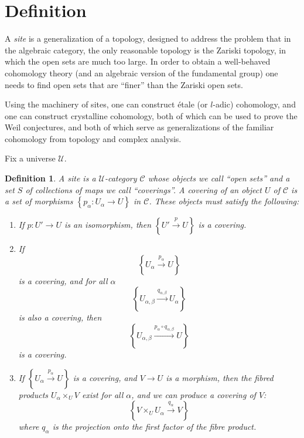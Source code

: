 \documentclass[12pt]{article}
\newcommand{\curlies}[1]{\left\{{#1}\right\}}
\newtheorem{defn}{Definition}
\begin{document}
\section*{Definition}

A \emph{site} is a generalization of a topology, designed to address the problem that in the algebraic category, the only reasonable topology is the Zariski topology, in which the open sets are much too large.  In order to obtain a well-behaved cohomology theory (and an algebraic version of the fundamental group) one needs to find open sets that are ``finer'' than the Zariski open sets.  

Using the machinery of sites, one can construct \'etale (or $l$-adic) cohomology, and one can construct crystalline cohomology, both of which can be used to prove the Weil conjectures, and both of which serve as generalizations of the familiar cohomology from topology and complex analysis. 

Fix a universe $\mathcal{U}$.

\begin{defn}
A \emph{site} is a $\mathcal{U}$-category $\mathcal{C}$ whose objects we call
``open sets'' and a set $S$ of collections of maps we call
``coverings''.  A covering of an object $U$ of $\mathcal{C}$ is a  set of morphisms
$\curlies{p_\alpha : U_\alpha \to U}$ in $\mathcal{C}$.  These objects
must satisfy the following:
\begin{enumerate}
\item If $p:U'\to U$ is an isomorphism, then $\curlies{U' \overset{p}{\to} U}$ is a covering.
\item If
\[
\curlies{U_\alpha \overset{p_\alpha}{\to} U}
\]
is a covering, and for all $\alpha$
\[
\curlies{U_{\alpha,\beta} \overset{q_{\alpha,\beta}}{\to} U_\alpha}
\]
is also a covering, then 
\[
\curlies{U_{\alpha,\beta} \overset{p_\alpha \circ
q_{\alpha,\beta}}{\longrightarrow} U}
\]
is a covering.
\item If $\curlies{U_\alpha \overset{p_\alpha}{\to} U}$ is a covering,
and $V\to U$ is a morphism, then the fibred products $U_\alpha \times_U V$ exist for all $\alpha$, and we can produce a covering of
$V$:
\[
\curlies{V\times_U U_\alpha \overset{q_\alpha}{\to} V}
\]
where $q_\alpha$ is the projection onto the first factor of the fibre
product.
\end{enumerate}
\end{defn}
\end{document}
